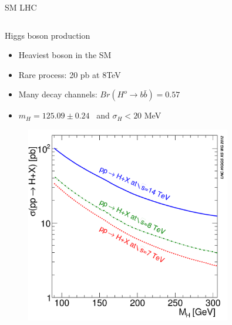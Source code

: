 \begin{frame}{SM \@ LHC}
\begin{columns}
\begin{column}{.50\textwidth}
\begin{block}{Higgs boson production}
\begin{itemize}\tiny
\item Heaviest boson in the SM 
\item Rare process: 20 pb at 8TeV
\item Many decay channels: $Br(H^{o}\to b\bar{b})=0.57$
\item $m_{H}=125.09\pm 0.24$ \GeVcc~and $\sigma_{H}<20$ MeV
\end{itemize}
\end{block}

\vspace{-.2cm}
\begin{figure}[!Hhtbp]
  \begin{center}
    \includegraphics[width=0.8\textwidth]{../figs/totalXS_LM.png}
  \end{center}
\end{figure}

\end{column}
\end{columns}

\end{frame}

